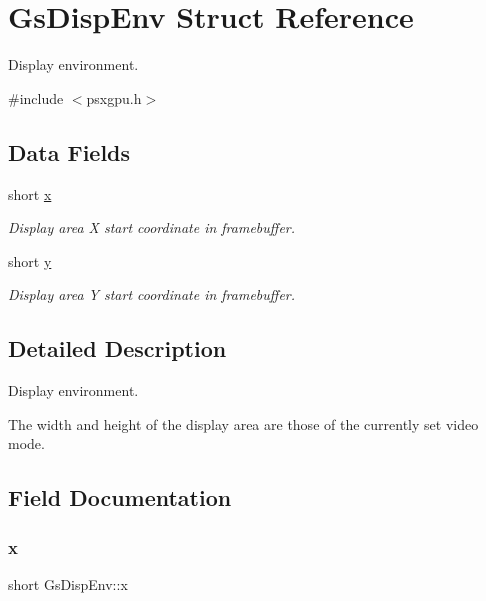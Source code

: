 \hypertarget{structGsDispEnv}{}\section{Gs\+Disp\+Env Struct Reference}
\label{structGsDispEnv}


Display environment.  




{\ttfamily \#include $<$psxgpu.\+h$>$}

\subsection*{Data Fields}
\begin{DoxyCompactItemize}
\item 
short \hyperlink{structGsDispEnv_a471f87bd77a7528868d29bf667af7d8c}{x}
\begin{DoxyCompactList}\small\item\em Display area X start coordinate in framebuffer. \end{DoxyCompactList}\item 
short \hyperlink{structGsDispEnv_ab1007184f6890f7f628699f43b553250}{y}
\begin{DoxyCompactList}\small\item\em Display area Y start coordinate in framebuffer. \end{DoxyCompactList}\end{DoxyCompactItemize}


\subsection{Detailed Description}
Display environment. 

The width and height of the display area are those of the currently set video mode. 

\subsection{Field Documentation}
\mbox{\label{structGsDispEnv_a471f87bd77a7528868d29bf667af7d8c}} 
\subsubsection{\texorpdfstring{x}{x}}
{\footnotesize\ttfamily short Gs\+Disp\+Env\+::x}



